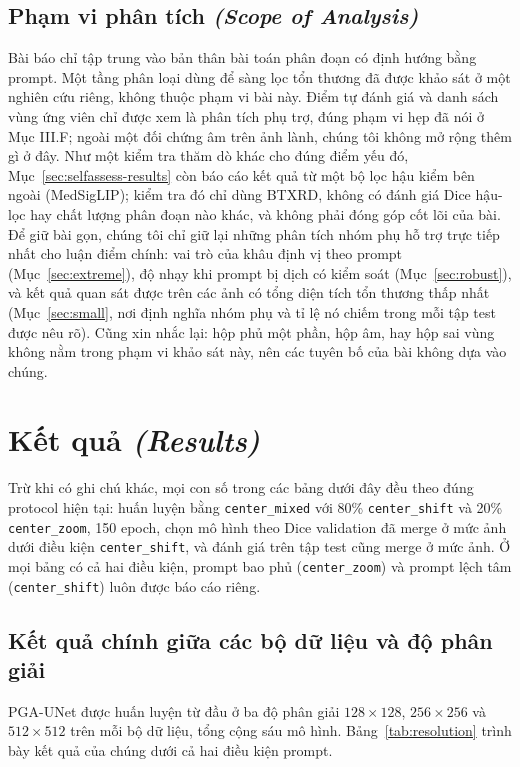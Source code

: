 \documentclass[11pt]{article}
\newcommand{\enlabel}[1]{{\small\itshape\color{gray} (#1)}}
\begin{document}
\subsection{Phạm vi phân tích \enlabel{Scope of Analysis}}
Bài báo chỉ tập trung vào bản thân bài toán phân đoạn có định hướng bằng prompt. Một tầng phân loại dùng để sàng lọc tổn thương đã được khảo sát ở một nghiên cứu riêng, không thuộc phạm vi bài này. Điểm tự đánh giá và danh sách vùng ứng viên chỉ được xem là phân tích phụ trợ, đúng phạm vi hẹp đã nói ở Mục III.F; ngoài một đối chứng âm trên ảnh lành, chúng tôi không mở rộng thêm gì ở đây. Như một kiểm tra thăm dò khác cho đúng điểm yếu đó, Mục~\ref{sec:selfassess-results} còn báo cáo kết quả từ một bộ lọc hậu kiểm bên ngoài (MedSigLIP); kiểm tra đó chỉ dùng BTXRD, không có đánh giá Dice hậu-lọc hay chất lượng phân đoạn nào khác, và không phải đóng góp cốt lõi của bài. Để giữ bài gọn, chúng tôi chỉ giữ lại những phân tích nhóm phụ hỗ trợ trực tiếp nhất cho luận điểm chính: vai trò của khâu định vị theo prompt (Mục~\ref{sec:extreme}), độ nhạy khi prompt bị dịch có kiểm soát (Mục~\ref{sec:robust}), và kết quả quan sát được trên các ảnh có tổng diện tích tổn thương thấp nhất (Mục~\ref{sec:small}, nơi định nghĩa nhóm phụ và tỉ lệ nó chiếm trong mỗi tập test được nêu rõ). Cũng xin nhắc lại: hộp phủ một phần, hộp âm, hay hộp sai vùng không nằm trong phạm vi khảo sát này, nên các tuyên bố của bài không dựa vào chúng.

\section{Kết quả \enlabel{Results}}
\label{sec:results}
Trừ khi có ghi chú khác, mọi con số trong các bảng dưới đây đều theo đúng protocol hiện tại: huấn luyện bằng \texttt{center\_mixed} với 80\% \texttt{center\_shift} và 20\% \texttt{center\_zoom}, 150 epoch, chọn mô hình theo Dice validation đã merge ở mức ảnh dưới điều kiện \texttt{center\_shift}, và đánh giá trên tập test cũng merge ở mức ảnh. Ở mọi bảng có cả hai điều kiện, prompt bao phủ (\texttt{center\_zoom}) và prompt lệch tâm (\texttt{center\_shift}) luôn được báo cáo riêng.

\subsection{Kết quả chính giữa các bộ dữ liệu và độ phân giải}
PGA-UNet được huấn luyện từ đầu ở ba độ phân giải $128\times128$, $256\times256$ và $512\times512$ trên mỗi bộ dữ liệu, tổng cộng sáu mô hình. Bảng~\ref{tab:resolution} trình bày kết quả của chúng dưới cả hai điều kiện prompt.
\end{document}
